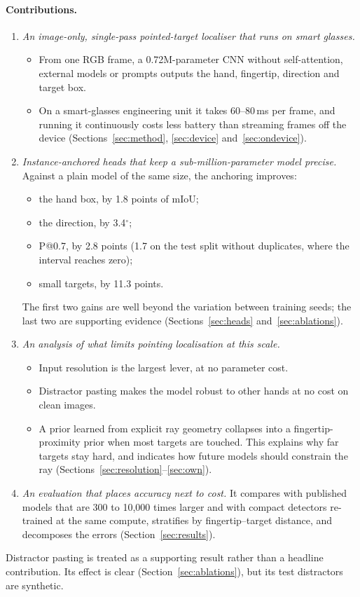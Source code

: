 \paragraph{Contributions.}
\begin{enumerate}
\item \emph{An image-only, single-pass pointed-target localiser that runs on smart glasses.}
  \begin{itemize}
  \item From one RGB frame, a 0.72M-parameter CNN without self-attention, external models or prompts outputs the hand, fingertip, direction and target box.
  \item On a smart-glasses engineering unit it takes 60--80\,ms per frame, and running it continuously costs less battery than streaming frames off the device (Sections~\ref{sec:method}, \ref{sec:device} and~\ref{sec:ondevice}).
  \end{itemize}
\item \emph{Instance-anchored heads that keep a sub-million-parameter model precise.} Against a plain model of the same size, the anchoring improves:
  \begin{itemize}
  \item the hand box, by 1.8 points of mIoU;
  \item the direction, by 3.4$^\circ$;
  \item P@0.7, by 2.8 points (1.7 on the test split without duplicates, where the interval reaches zero);
  \item small targets, by 11.3 points.
  \end{itemize}
  The first two gains are well beyond the variation between training seeds; the last two are supporting evidence (Sections~\ref{sec:heads} and~\ref{sec:ablations}).
\item \emph{An analysis of what limits pointing localisation at this scale.}
  \begin{itemize}
  \item Input resolution is the largest lever, at no parameter cost.
  \item Distractor pasting makes the model robust to other hands at no cost on clean images.
  \item A prior learned from explicit ray geometry collapses into a fingertip-proximity prior when most targets are touched. This explains why far targets stay hard, and indicates how future models should constrain the ray (Sections~\ref{sec:resolution}--\ref{sec:own}).
  \end{itemize}
\item \emph{An evaluation that places accuracy next to cost.} It compares with published models that are 300 to 10{,}000 times larger and with compact detectors re-trained at the same compute, stratifies by fingertip--target distance, and decomposes the errors (Section~\ref{sec:results}).
\end{enumerate}
Distractor pasting is treated as a supporting result rather than a headline contribution. Its effect is clear (Section~\ref{sec:ablations}), but its test distractors are synthetic.
